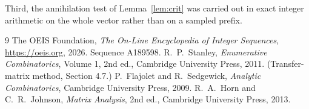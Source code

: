 \documentclass[11pt,a4paper]{article}
\theoremstyle{plain}
\theoremstyle{definition}
\begin{document}
Third, the annihilation test of Lemma~\ref{lem:crit} was carried out in exact integer
arithmetic on the whole vector rather than on a sampled prefix.

\begin{thebibliography}{9}
 The OEIS Foundation, \emph{The On-Line Encyclopedia of Integer
Sequences}, \url{https://oeis.org}, 2026. Sequence A189598.
 R.~P.~Stanley, \emph{Enumerative Combinatorics}, Volume 1, 2nd ed.,
Cambridge University Press, 2011. (Transfer-matrix method, Section 4.7.)
 P.~Flajolet and R.~Sedgewick, \emph{Analytic Combinatorics}, Cambridge
University Press, 2009.
 R.~A.~Horn and C.~R.~Johnson, \emph{Matrix Analysis}, 2nd ed., Cambridge
University Press, 2013.
\end{thebibliography}
\end{document}
